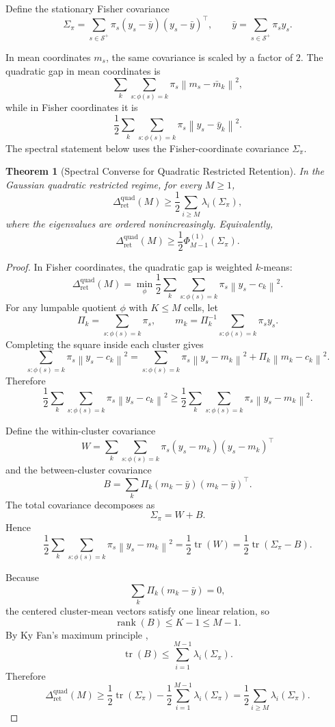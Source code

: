 \documentclass[12pt]{article}
\newtheorem{theorem}{Theorem}[section]
\theoremstyle{definition}
\DeclareMathOperator{\rank}{rank}
\DeclareMathOperator{\tr}{tr}
\newcommand{\norm}[1]{\left\lVert#1\right\rVert}
\newcommand{\RetQuad}{\Delta_{\mathrm{ret}}^{\mathrm{quad}}}
\newcommand{\Splus}{\mathcal S^{+}}
\begin{document}
Define the stationary Fisher covariance
\[
\Sigma_\pi
=
\sum_{s\in\Splus}
\pi_s
(y_s-\bar y)(y_s-\bar y)^\top,
\qquad
\bar y=\sum_{s\in\Splus}\pi_s y_s.
\]

In mean coordinates $m_s$, the same covariance is scaled by a factor of $2$.
The quadratic gap in mean coordinates is
\[
\sum_k\sum_{s:\phi(s)=k}\pi_s
\norm{m_s-\bar m_k}^2,
\]
while in Fisher coordinates it is
\[
\frac12
\sum_k\sum_{s:\phi(s)=k}\pi_s
\norm{y_s-\bar y_k}^2.
\]
The spectral statement below uses the Fisher-coordinate covariance
$\Sigma_\pi$.

\begin{theorem}[Spectral Converse for Quadratic Restricted Retention]
\label{thm:spectral-retention}
In the Gaussian quadratic restricted regime, for every $M\ge1$,
\[
\RetQuad(M)
\ge
\frac12
\sum_{i\ge M}
\lambda_i(\Sigma_\pi),
\]
where the eigenvalues are ordered nonincreasingly.  Equivalently,
\[
\RetQuad(M)
\ge
\frac12
\Phi^{(1)}_{M-1}(\Sigma_\pi).
\]
\end{theorem}

\begin{proof}
In Fisher coordinates, the quadratic gap is weighted $k$-means:
\[
\RetQuad(M)
=
\min_{\phi}
\frac12
\sum_{k}
\sum_{s:\phi(s)=k}
\pi_s
\norm{y_s-c_k}^2.
\]
For any lumpable quotient $\phi$ with $K\le M$ cells, let
\[
\Pi_k=\sum_{s:\phi(s)=k}\pi_s,
\qquad
m_k=\Pi_k^{-1}\sum_{s:\phi(s)=k}\pi_s y_s.
\]
Completing the square inside each cluster gives
\[
\sum_{s:\phi(s)=k}
\pi_s
\norm{y_s-c_k}^2
=
\sum_{s:\phi(s)=k}
\pi_s
\norm{y_s-m_k}^2
+
\Pi_k
\norm{m_k-c_k}^2.
\]
Therefore
\[
\frac12
\sum_{k}
\sum_{s:\phi(s)=k}
\pi_s
\norm{y_s-c_k}^2
\ge
\frac12
\sum_{k}
\sum_{s:\phi(s)=k}
\pi_s
\norm{y_s-m_k}^2.
\]

Define the within-cluster covariance
\[
W
=
\sum_{k}
\sum_{s:\phi(s)=k}
\pi_s
(y_s-m_k)(y_s-m_k)^\top
\]
and the between-cluster covariance
\[
B
=
\sum_{k}
\Pi_k
(m_k-\bar y)(m_k-\bar y)^\top.
\]
The total covariance decomposes as
\[
\Sigma_\pi=W+B.
\]
Hence
\[
\frac12
\sum_{k}
\sum_{s:\phi(s)=k}
\pi_s
\norm{y_s-m_k}^2
=
\frac12\tr(W)
=
\frac12\tr(\Sigma_\pi-B).
\]

Because
\[
\sum_k \Pi_k(m_k-\bar y)=0,
\]
the centered cluster-mean vectors satisfy one linear relation, so
\[
\rank(B)\le K-1\le M-1.
\]
By Ky Fan's maximum principle \cite{kyfan1951},
\[
\tr(B)
\le
\sum_{i=1}^{M-1}
\lambda_i(\Sigma_\pi).
\]
Therefore
\[
\RetQuad(M)
\ge
\frac12\tr(\Sigma_\pi)
-
\frac12
\sum_{i=1}^{M-1}
\lambda_i(\Sigma_\pi)
=
\frac12
\sum_{i\ge M}
\lambda_i(\Sigma_\pi).
\]
\end{proof}
\end{document}
